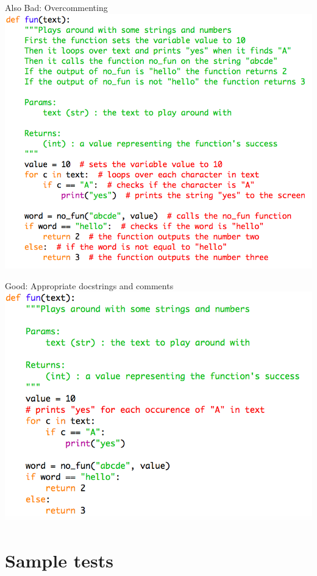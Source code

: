 \documentclass[week2]{csse1001}
\begin{document}
\begin{topic}{Also Bad: Overcommenting}
\includegraphics[height=0.9\textheight]{bad_python/bad_comments}
\end{topic}

\begin{topic}{Good: Appropriate docstrings and comments}
\includegraphics[height=0.9\textheight]{bad_python/good_comments}
\end{topic}

\section{Sample tests}
\end{document}

